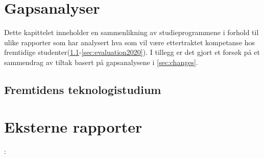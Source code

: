 \documentclass[a4paper, oneside, 12pt]{memoir}
\begin{document}

\chapter{Gapsanalyser}
\label{chap:gap-analysis}

Dette kapittelet inneholder en sammenlikning av studieprogrammene i forhold til ulike rapporter som har analysert hva som vil være ettertraktet kompetanse hos fremtidige studenter(\ref{sec:fts}-\ref{sec:evaluation2020}). I tillegg er det gjort et forsøk på et sammendrag av tiltak basert på gapsanalysene i \ref{sec:changes}.



\section{Fremtidens teknologistudium}
	\label{sec:fts}
	
	



\chapter{Eksterne rapporter}
\label{chap:external-reports}



:




\fi %

\printbibliography





\end{document}
